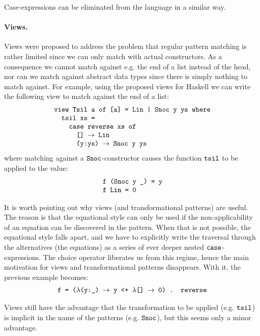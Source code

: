 \documentclass[fleqn]{article}
\newcommand{\ve}[1]{\ensuremath{\text{\tt #1}}}
\newcommand{\ra}{\ensuremath{\rightarrow} }
\begin{document}
Case-expressions can be eliminated from the language in a similar way.


\paragraph{Views.}  

Views \cite{views87} were proposed to address the problem that regular
pattern matching is rather limited since we can only match with actual
constructors.  As a consequence we cannot match against e.g. the end
of a list instead of the head, nor can we match against abstract data
types since there is simply nothing to match against.  For example,
using the proposed views for Haskell \cite{views96} we can write the
following view to match against the end of a list:
\[
\begin{array}{l}
\ve{view Tsil a of [a] = Lin | Snoc y ys where} \\
\ve{\quad tsil xs =} \\
\ve{\quad \quad case reverse xs of} \\
\ve{\quad \quad \quad [] \ra Lin} \\
\ve{\quad \quad \quad (y:ys) \ra Snoc y ys}
\end{array}
\]
where matching against a \ve{Snoc}-constructor causes the function
\ve{tsil} to be applied to the value:
\[
\begin{array}{l}
\ve{f (Snoc y \_) = y} \\
\ve{f Lin = 0}
\end{array}
\]

It is worth pointing out why views (and transformational
patterns) are useful.  The reason is that the equational style can
only be used if the non-applicability of an equation can be discovered
in the pattern.  When that is not possible, the equational style falls
apart, and we have to explicitly write the traversal through the
alternatives (the equations) as a series of ever deeper nested
\ve{case}-expressions.
The choice operator liberates us from this regime, hence the main
motivation for views and transformational patterns disappears.  With
it, the
previous example becomes:
\[
\begin{array}{l}
\ve{f = ($\lambda$(y:\_) \ra y <+ $\lambda$[] \ra 0) . reverse}
\end{array}
\]

Views still have the advantage that the transformation to be applied
(e.g. \ve{tsil}) is implicit in the name of the patterns
(e.g. \ve{Snoc}), but this seems only a minor advantage.
\end{document}

